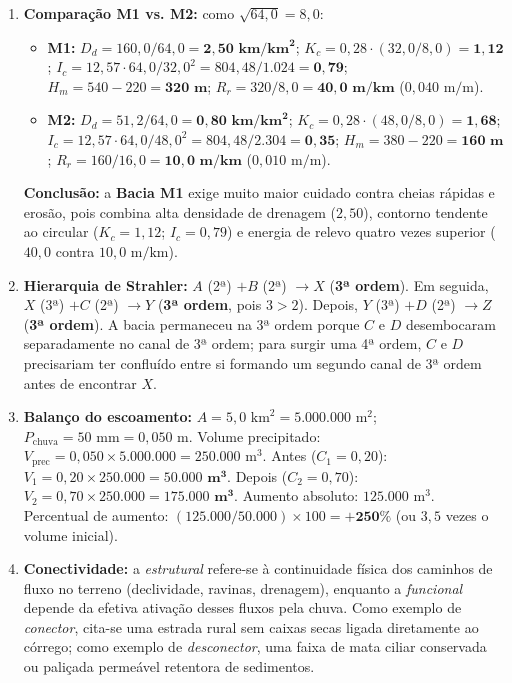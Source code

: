 \begin{boxGabarito}
\begin{enumerate}[leftmargin=1.8em, itemsep=3.5pt]
  \item \textbf{Comparação M1 vs. M2:} como $\sqrt{64{,}0} = 8{,}0$:
  \begin{itemize}[leftmargin=1.4em, itemsep=1pt]
    \item \textbf{M1:} $D_d = 160{,}0 / 64{,}0 = \mathbf{2{,}50\text{ km}/\text{km}^2}$; $K_c = 0{,}28 \cdot (32{,}0 / 8{,}0) = \mathbf{1{,}12}$; $I_c = 12{,}57 \cdot 64{,}0 / 32{,}0^2 = 804{,}48 / 1.024 = \mathbf{0{,}79}$; $H_m = 540 - 220 = \mathbf{320\text{ m}}$; $R_r = 320 / 8{,}0 = \mathbf{40{,}0\text{ m}/\text{km}}$ ($0{,}040\text{ m}/\text{m}$).
    \item \textbf{M2:} $D_d = 51{,}2 / 64{,}0 = \mathbf{0{,}80\text{ km}/\text{km}^2}$; $K_c = 0{,}28 \cdot (48{,}0 / 8{,}0) = \mathbf{1{,}68}$; $I_c = 12{,}57 \cdot 64{,}0 / 48{,}0^2 = 804{,}48 / 2.304 = \mathbf{0{,}35}$; $H_m = 380 - 220 = \mathbf{160\text{ m}}$; $R_r = 160 / 16{,}0 = \mathbf{10{,}0\text{ m}/\text{km}}$ ($0{,}010\text{ m}/\text{m}$).
  \end{itemize}
  \textbf{Conclusão:} a \textbf{Bacia M1} exige muito maior cuidado contra cheias rápidas e erosão, pois combina alta densidade de drenagem ($2{,}50$), contorno tendente ao circular ($K_c = 1{,}12$; $I_c = 0{,}79$) e energia de relevo quatro vezes superior ($40{,}0$ contra $10{,}0\text{ m}/\text{km}$).

  \item \textbf{Hierarquia de Strahler:} $A$ (2ª) $+ B$ (2ª) $\to X$ (\textbf{3ª ordem}). Em seguida, $X$ (3ª) $+ C$ (2ª) $\to Y$ (\textbf{3ª ordem}, pois $3 > 2$). Depois, $Y$ (3ª) $+ D$ (2ª) $\to Z$ (\textbf{3ª ordem}). A bacia permaneceu na 3ª ordem porque $C$ e $D$ desembocaram separadamente no canal de 3ª ordem; para surgir uma 4ª ordem, $C$ e $D$ precisariam ter confluído entre si formando um segundo canal de 3ª ordem antes de encontrar $X$.

  \item \textbf{Balanço do escoamento:} $A = 5{,}0\text{ km}^2 = 5.000.000\text{ m}^2$; $P_{\text{chuva}} = 50\text{ mm} = 0{,}050\text{ m}$. Volume precipitado: $V_{\text{prec}} = 0{,}050 \times 5.000.000 = 250.000\text{ m}^3$. Antes ($C_1 = 0{,}20$): $V_1 = 0{,}20 \times 250.000 = \mathbf{50.000\text{ m}^3}$. Depois ($C_2 = 0{,}70$): $V_2 = 0{,}70 \times 250.000 = \mathbf{175.000\text{ m}^3}$. Aumento absoluto: $125.000\text{ m}^3$. Percentual de aumento: $(125.000 / 50.000) \times 100 = \mathbf{+250\%}$ (ou $3{,}5$ vezes o volume inicial).

  \item \textbf{Conectividade:} a \textit{estrutural} refere-se à continuidade física dos caminhos de fluxo no terreno (declividade, ravinas, drenagem), enquanto a \textit{funcional} depende da efetiva ativação desses fluxos pela chuva. Como exemplo de \textit{conector}, cita-se uma estrada rural sem caixas secas ligada diretamente ao córrego; como exemplo de \textit{desconector}, uma faixa de mata ciliar conservada ou paliçada permeável retentora de sedimentos.


\end{enumerate}
\end{boxGabarito}
